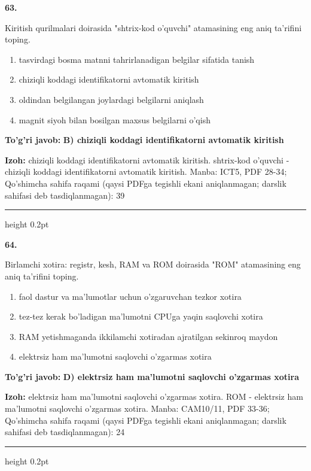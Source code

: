 \documentclass[10pt,a4paper]{article}
\begin{document}
{\bfseries\sffamily\color{ink} 63.}
\par
Kiritish qurilmalari doirasida "shtrix-kod o'quvchi" atamasining eng aniq ta'rifini toping.
\begin{enumerate}[label=\Alph*),leftmargin=9mm]
\item tasvirdagi bosma matnni tahrirlanadigan belgilar sifatida tanish
\item chiziqli koddagi identifikatorni avtomatik kiritish
\item oldindan belgilangan joylardagi belgilarni aniqlash
\item magnit siyoh bilan bosilgan maxsus belgilarni o'qish
\end{enumerate}
\begin{tcolorbox}[enhanced,breakable,colback=teal!4,colframe=teal!60!black,boxrule=0.45pt,arc=1.2mm,left=2.7mm,right=2.7mm,top=1.8mm,bottom=1.8mm,before skip=2mm,after skip=2mm]
{\bfseries\sffamily\color{teal}To'g'ri javob:} \textbf{B) chiziqli koddagi identifikatorni avtomatik kiritish}
\par\smallskip
{\bfseries Izoh:} chiziqli koddagi identifikatorni avtomatik kiritish. shtrix-kod o'quvchi - chiziqli koddagi identifikatorni avtomatik kiritish. Manba: ICT5, PDF 28-34; Qo'shimcha sahifa raqami (qaysi PDFga tegishli ekani aniqlanmagan; darslik sahifasi deb tasdiqlanmagan): 39
\end{tcolorbox}
\vspace{2mm}\hrule height 0.2pt\vspace{3mm}

{\bfseries\sffamily\color{ink} 64.}
\par
Birlamchi xotira: registr, kesh, RAM va ROM doirasida "ROM" atamasining eng aniq ta'rifini toping.
\begin{enumerate}[label=\Alph*),leftmargin=9mm]
\item faol dastur va ma'lumotlar uchun o'zgaruvchan tezkor xotira
\item tez-tez kerak bo'ladigan ma'lumotni CPUga yaqin saqlovchi xotira
\item RAM yetishmaganda ikkilamchi xotiradan ajratilgan sekinroq maydon
\item elektrsiz ham ma'lumotni saqlovchi o'zgarmas xotira
\end{enumerate}
\begin{tcolorbox}[enhanced,breakable,colback=teal!4,colframe=teal!60!black,boxrule=0.45pt,arc=1.2mm,left=2.7mm,right=2.7mm,top=1.8mm,bottom=1.8mm,before skip=2mm,after skip=2mm]
{\bfseries\sffamily\color{teal}To'g'ri javob:} \textbf{D) elektrsiz ham ma'lumotni saqlovchi o'zgarmas xotira}
\par\smallskip
{\bfseries Izoh:} elektrsiz ham ma'lumotni saqlovchi o'zgarmas xotira. ROM - elektrsiz ham ma'lumotni saqlovchi o'zgarmas xotira. Manba: CAM10/11, PDF 33-36; Qo'shimcha sahifa raqami (qaysi PDFga tegishli ekani aniqlanmagan; darslik sahifasi deb tasdiqlanmagan): 24
\end{tcolorbox}
\vspace{2mm}\hrule height 0.2pt\vspace{3mm}
\end{document}
